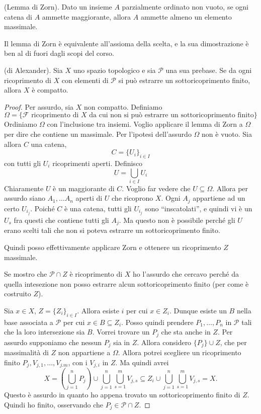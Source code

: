 \begin{thm}
    (Lemma di Zorn). Dato un insieme $A$ parzialmente ordinato non vuoto, se ogni catena di $A$ ammette maggiorante, allora $A$ ammette almeno un elemento massimale.
\end{thm}
\begin{oss}
    Il lemma di Zorn \`e equivalente all'assioma della scelta, e la sua dimostrazione \`e ben al di fuori dagli scopi del corso.
\end{oss}
\begin{thm}
    (di Alexander). Sia $X$ uno spazio topologico e sia $\mathcal{P}$ una sua prebase. Se da ogni ricoprimento di $X$ con elementi di $\mathcal{P}$ si pu\`o estrarre un sottoricoprimento finito, allora $X$ \`e compatto.
\end{thm}
\begin{proof}
    Per assurdo, sia $X$ non compatto. Definiamo
    \[
        \Omega = \{\mathcal{F} \text{ ricoprimento di $X$ da cui non si pu\`o estrarre un sottoricoprimento finito}\}
    \]
    Ordiniamo $\Omega$ con l'inclusione tra insiemi. Voglio applicare il lemma di Zorn a $\Omega$ per dire che contiene un massimale. Per l'ipotesi dell'assurdo $\Omega$ non \`e vuoto. Sia allora $C$ una catena,
    \[
        C = \{U_i\}_{i\in I}
    \]
    con tutti gli $U_i$ ricoprimenti aperti. Definisco
    \[
        U = \bigcup_{i\in I}U_i
    \]
    Chiaramente $U$ \`e un maggiorante di $C$. Voglio far vedere che $U \subseteq\Omega$. Allora per assurdo siano $A_1, \dots A_n$ aperti di $U$  che ricoprono $X$. Ogni $A_j$ appartiene ad un certo $U_{i_j}$. Poich\'e $C$ \`e una catena, tutti gli $U_{i_j}$ sono ``inscatolati'', e quindi vi \`e un $U_s$ fra questi che contiene tutti gli $A_j$. Ma questo non \`e possibile perch\'e gli $U$ erano scelti tali che non si poteva estrarre un sottoricoprimento finito.

    Quindi posso effettivamente applicare Zorn e ottenere un ricoprimento $Z$ massimale.

    Se mostro che $\mathcal{P}\cap Z$ \`e ricoprimento di $X$ ho l'assurdo che cercavo perch\'e da quella intesezione non posso estrarre alcun sottoricoprimento finito (per come \`e costruito $Z$).

    Sia $x\in X$, $Z = \{Z_i\}_{i\in I}$. Allora esiste $i$ per cui $x\in Z_i$. Dunque esiste un $B$ nella base associata a $\mathcal{P}$ per cui $x\in B\subseteq Z_i$. Posso quindi prendere $P_1, \dots, P_n$ in $\mathcal{P}$ tali che la loro intersezione sia $B$. Vorrei trovare un $P_j$ che sta anche in $Z$. Per assurdo supponiamo che nessun $P_j$ sia in $Z$. Allora considero ${\{P_j \} \cup Z}$, che per massimalit\`a di $Z$ non appartiene a $\Omega$.
    Allora potrei scegliere un ricoprimento finito $P_j, V_{j,1}, \dots, V_{j.m}$, con i $V_{j,i}$ in $Z$. Ma quindi avrei
    \[
        X = \left(\bigcup_{j=1}^nP_j\right)\cup \bigcup_{j=1}^n\bigcup_{s=1}^m V_{j,s} \subseteq Z_i \cup \bigcup_{j=1}^n\bigcup_{s=1}^m V_{j,s} = X.
    \]
    Questo \`e assurdo in quanto ho appena trovato un sottoricoprimento finito di $Z$.
    Quindi ho finito, osservando che $P_j\in \mathcal{P}\cap Z$.
\end{proof}

